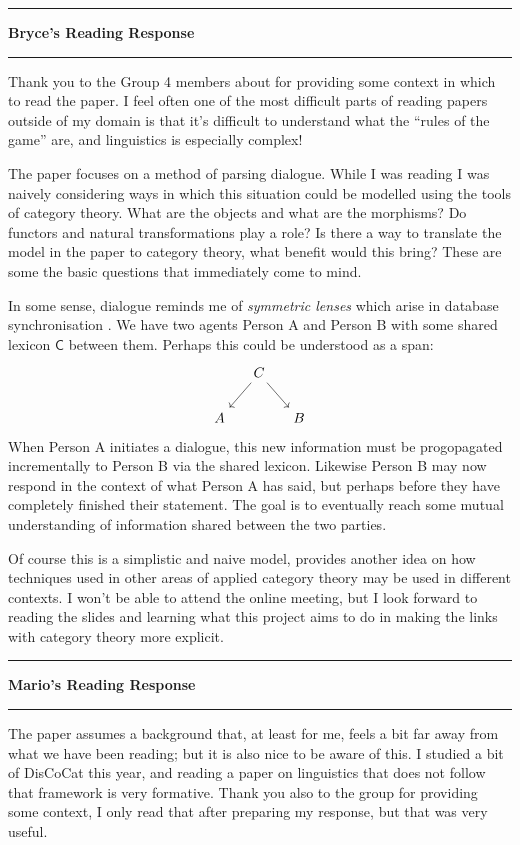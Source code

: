\documentclass{amsart}
\newcommand{\iam}[1]{
  \vspace{0.25em}
  \hrule
  \vspace{0.25em}
  \textbf{{#1}'s Reading Response}
  \vspace{0.25em}
  \hrule
  \vspace{1em}
}
\begin{document}
\iam{Bryce}
Thank you to the Group 4 members about for providing some context in which to read the paper.
I feel often one of the most difficult parts of reading papers outside of my domain is that it's
difficult to understand what the ``rules of the game'' are, and linguistics is
especially complex!

The paper focuses on a method of parsing dialogue.
While I was reading I was naively considering ways in which this situation could be modelled
using the tools of category theory.
What are the objects and what are the morphisms? Do functors and natural transformations play
a role? Is there a way to translate the model in the paper to category theory, what benefit
would this bring? These are some the basic questions that immediately come to mind.

In some sense, dialogue reminds me of \emph{symmetric lenses} which arise in database
synchronisation \cite{Diskin, symmetriclens}.
We have two agents \textsf{Person A} and \textsf{Person B} with some shared lexicon $\mathsf{C}$ between them. Perhaps this could be understood as a span:
\begin{equation*}
\begin{tikzcd}[column sep = small]
& C
\arrow[ld]
\arrow[rd]
& \\
A & & B
\end{tikzcd}
\end{equation*}
When \textsf{Person A} initiates a dialogue, this new information must be progopagated
incrementally to \textsf{Person B} via the shared lexicon.
Likewise \textsf{Person B} may now respond in the context of what \textsf{Person A} has
said, but perhaps before they have completely finished their statement.
The goal is to eventually reach some mutual understanding of information shared between the two
parties.

Of course this is a simplistic and naive model, provides another idea on how techniques used
in other areas of applied category theory may be used in different contexts.
I won't be able to attend the online meeting, but I look forward to reading the slides and
learning what this project aims to do in making the links with category theory more
explicit.

\iam{Mario}

The paper assumes a background that, at least for me, feels a bit far
away from what we have been reading; but it is also nice to be aware
of this.  I studied a bit of DisCoCat this year, and reading a paper
on linguistics that does not follow that framework is very formative.
Thank you also to the group for providing some context, I only read
that after preparing my response, but that was very useful.
\end{document}
